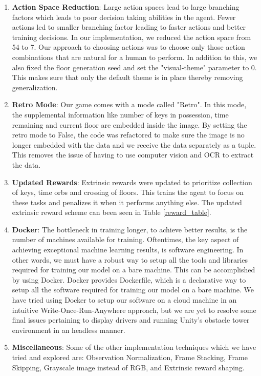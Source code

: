 \documentclass[conference]{IEEEtran}
\begin{document}
\begin{enumerate}
    \item \textbf{Action Space Reduction}: Large action spaces lead to large branching factors which leads to poor decision taking abilities in the agent. Fewer actions led to smaller branching factor leading to faster actions and better training decisions. In our implementation, we reduced the action space from 54 to 7. Our approach to choosing actions was to choose only those action combinations that are natural for a human to perform. In addition to this, we also fixed the floor generation seed and set the "visual-theme" parameter to 0. This makes sure that only the default theme is in place thereby removing generalization. 
    \item \textbf{Retro Mode}: Our game comes with a mode called "Retro". In this mode, the supplemental information like number of keys in possession, time remaining and current floor are embedded inside the image. By setting the retro mode to False, the code was refactored to make sure the image is no longer embedded with the data and we receive the data separately as a tuple. This removes the issue of having to use computer vision and OCR to extract the data.
    \item \textbf{Updated Rewards}: Extrinsic rewards were updated to prioritize collection of keys, time orbs and crossing of floors. This trains the agent to focus on these tasks and penalizes it when it performs anything else. The updated extrinsic reward scheme can been seen in Table \ref{reward_table}.
    \item \textbf{Docker}: The bottleneck in training longer, to achieve better results, is the number of machines available for training. Oftentimes, the key aspect of achieving exceptional machine learning results, is software engineering. In other words, we must have a robust way to setup all the tools and libraries required for training our model on a bare machine. This can be accomplished by using Docker. Docker provides Dockerfile, which is a declarative way to setup all the software required for training our model on a bare machine. We have tried using Docker to setup our software on a cloud machine in an intuitive Write-Once-Run-Anywhere approach, but we are yet to resolve some final issues pertaining to display drivers and running Unity's obstacle tower environment in an headless manner.
    \item \textbf{Miscellaneous}: Some of the other implementation techniques which we have tried and explored are: Observation Normalization, Frame Stacking, Frame Skipping, Grayscale image instead of RGB, and Extrinsic reward shaping.
\end{enumerate}
\end{document}
